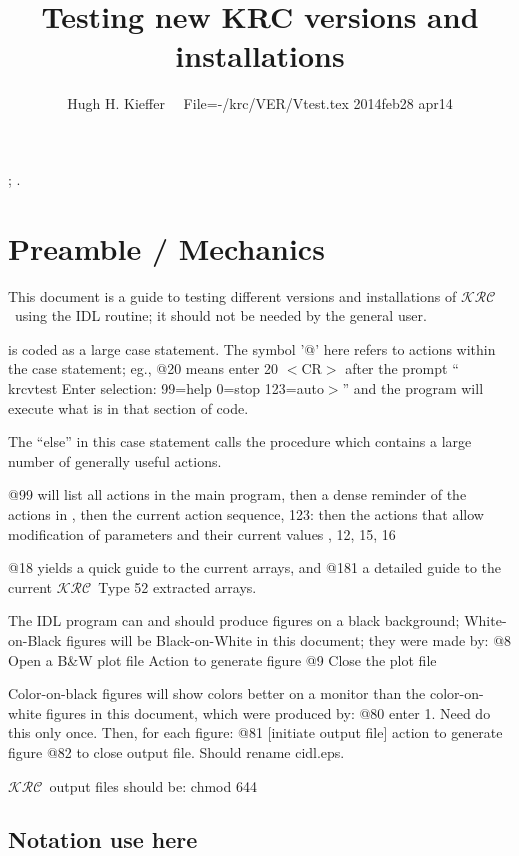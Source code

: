 \documentclass{article}  %
\title{Testing new KRC versions and installations}
\author{Hugh H. Kieffer  \ \ File=-/krc/VER/Vtest.tex 2014feb28 apr14}
\newcommand{\krc}{$\mathcal{KRC}$~}    %
\begin{document}
\maketitle
\tableofcontents
\listoffigures
; \hrulefill .\hrulefill

\section{Preamble / Mechanics}
This document is a guide to testing different versions and installations of \krc using the  IDL routine; it
should not be needed by the general user.

  is coded as a large case statement. The symbol '@' here
 refers to actions within the case statement; eg., @20 means enter 20 $<$CR$>$ after
 the prompt `` krcvtest Enter selection: 99=help 0=stop 123=auto$>$'' and the
 program will execute what is in that section of code.

The ``else'' in this case statement calls the procedure  which contains a large number of generally useful actions. 

@99 will list all actions in the main program, 
\qi then a dense reminder of the actions in , 
\qi then the current action sequence, 123:
\qi then the actions that allow modification of parameters and their current values
, 12, 15, 16 

@18 yields a quick guide to the current arrays, and @181 a detailed guide to the current \krc Type 52 extracted arrays.

The IDL program can and should produce figures on a black background; White-on-Black figures will be Black-on-White in this document; they were made by:
\qi @8 Open a B\&W  plot file
\qii  Action to generate figure
\qi @9 Close the plot file
 
Color-on-black figures will show colors better on a monitor than the color-on-white figures in this document, which were produced by:
\qi @80  enter 1.  Need do this only once.  Then, for each figure:
\qi @81 [initiate output file]
\qi  action to generate figure
\qi @82  to close output file. Should rename cidl.eps.

\krc output files should be: chmod 644

\subsection{Notation use here}
\end{document}
